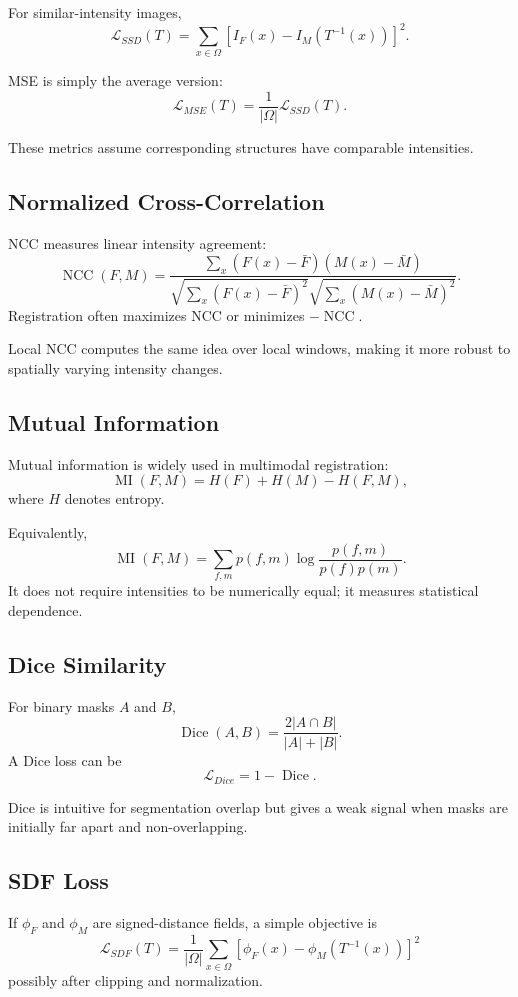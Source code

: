 \documentclass[11pt,a4paper]{article}
\newcommand{\Loss}{\mathcal{L}}
\begin{document}
For similar-intensity images,
\[
\Loss_{SSD}(T)
=
\sum_{x\in\Omega}
\left[
I_F(x)-I_M(T^{-1}(x))
\right]^2.
\]

MSE is simply the average version:
\[
\Loss_{MSE}(T)
=
\frac{1}{|\Omega|}\Loss_{SSD}(T).
\]

These metrics assume corresponding structures have comparable intensities.

\subsection{Normalized Cross-Correlation}

NCC measures linear intensity agreement:
\[
\operatorname{NCC}(F,M)
=
\frac{\sum_x(F(x)-\bar F)(M(x)-\bar M)}
{\sqrt{\sum_x(F(x)-\bar F)^2}\sqrt{\sum_x(M(x)-\bar M)^2}}.
\]
Registration often maximizes NCC or minimizes $-\operatorname{NCC}$.

Local NCC computes the same idea over local windows, making it more robust to spatially varying intensity changes.

\subsection{Mutual Information}

Mutual information is widely used in multimodal registration:
\[
\operatorname{MI}(F,M)
=
H(F)+H(M)-H(F,M),
\]
where $H$ denotes entropy.

Equivalently,
\[
\operatorname{MI}(F,M)
=
\sum_{f,m}p(f,m)
\log\frac{p(f,m)}{p(f)p(m)}.
\]
It does not require intensities to be numerically equal; it measures statistical dependence.

\subsection{Dice Similarity}

For binary masks $A$ and $B$,
\[
\operatorname{Dice}(A,B)
=
\frac{2|A\cap B|}{|A|+|B|}.
\]
A Dice loss can be
\[
\Loss_{Dice}=1-\operatorname{Dice}.
\]

Dice is intuitive for segmentation overlap but gives a weak signal when masks are initially far apart and non-overlapping.

\subsection{SDF Loss}

If $\phi_F$ and $\phi_M$ are signed-distance fields, a simple objective is
\[
\boxed{
\Loss_{SDF}(T)
=
\frac{1}{|\Omega|}
\sum_{x\in\Omega}
\left[
\phi_F(x)-\phi_M(T^{-1}(x))
\right]^2
}
\]
possibly after clipping and normalization.
\end{document}
